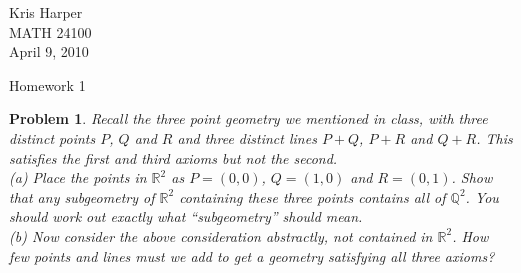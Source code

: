 \documentclass{article}
\newtheorem{problem}{Problem}
\begin{document}
\begin{flushright}
Kris Harper\\

MATH 24100\\

April 9, 2010
\end{flushright}

\begin{center}
Homework 1
\end{center}

\begin{problem}
Recall the three point geometry we mentioned in class, with three distinct points $P$, $Q$ and $R$ and three distinct lines $P+Q$, $P+R$ and $Q+R$. This satisfies the first and third axioms but not the second.\\
(a) Place the points in $\mathbb{R}^2$ as $P = (0,0)$, $Q = (1,0)$ and $R = (0,1)$. Show that any subgeometry of $\mathbb{R}^2$ containing these three points contains all of $\mathbb{Q}^2$. You should work out exactly what ``subgeometry'' should mean.\\
(b) Now consider the above consideration abstractly, not contained in $\mathbb{R}^2$. How few points and lines must we add to get a geometry satisfying all three axioms?
\end{problem}
\end{document}
